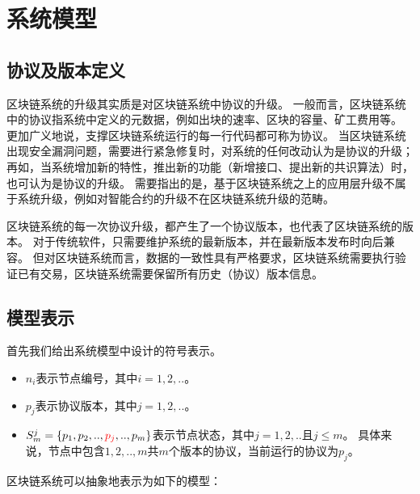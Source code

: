 
\section{系统模型}

\subsection{协议及版本定义}
区块链系统的升级其实质是对区块链系统中协议的升级。
一般而言，区块链系统中的协议指系统中定义的元数据，例如出块的速率、区块的容量、矿工费用等。
更加广义地说，支撑区块链系统运行的每一行代码都可称为协议。
当区块链系统出现安全漏洞问题，需要进行紧急修复时，对系统的任何改动认为是协议的升级；
再如，当系统增加新的特性，推出新的功能（新增接口、提出新的共识算法）时，也可认为是协议的升级。
需要指出的是，基于区块链系统之上的应用层升级不属于系统升级，例如对智能合约的升级不在区块链系统升级的范畴。

区块链系统的每一次协议升级，都产生了一个协议版本，也代表了区块链系统的版本。
对于传统软件，只需要维护系统的最新版本，并在最新版本发布时向后兼容。
但对区块链系统而言，数据的一致性具有严格要求，区块链系统需要执行验证已有交易，区块链系统需要保留所有历史（协议）版本信息。

\subsection{模型表示}
首先我们给出系统模型中设计的符号表示。
\begin{itemize}
  \item $n_i$表示节点编号，其中$i=1,2,..$。
  \item $p_j$表示协议版本，其中$j=1,2,..$。
  \item $S_{m}^{j} =
    \{p_1,p_2,..,\textcolor{red}{p_j},..,p_m\}$表示节点状态，其中$j=1,2,..$且$j{\leq}m$。
    具体来说，节点中包含$1,2,..,m$共$m$个版本的协议，当前运行的协议为$p_j$。
\end{itemize}

区块链系统可以抽象地表示为如下的模型：

